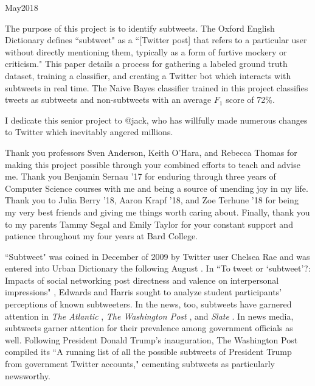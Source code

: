\documentclass[11pt, twoside, reqno]{book}
\begin{document}
    {May}{2018}

\abstr

The purpose of this project is to identify subtweets. The Oxford English Dictionary defines ``subtweet" as a ``[Twitter post] that refers to a particular user without directly mentioning them, typically as a form of furtive mockery or criticism." This paper details a process for gathering a labeled ground truth dataset, training a classifier, and creating a Twitter bot which interacts with subtweets in real time. The Naive Bayes classifier trained in this project classifies tweets as subtweets and non-subtweets with an average $F_{1}$ score of 72\%. 

\tableofcontents

\listoffigures

\dedic

I dedicate this senior project to @jack, who has willfully made numerous changes to Twitter which inevitably angered millions.

\acknowl

Thank you professors Sven Anderson, Keith O'Hara, and Rebecca Thomas for making this project possible through your combined efforts to teach and advise me. Thank you Benjamin Sernau '17 for enduring through three years of Computer Science courses with me and being a source of unending joy in my life. Thank you to Julia Berry '18, Aaron Krapf '18, and Zoe Terhune '18 for being my very best friends and giving me things worth caring about. Finally, thank you to my parents Tammy Segal and Emily Taylor for your constant support and patience throughout my four years at Bard College. 

\startmain
\intro

``Subtweet" was coined in December of 2009 by Twitter user Chelsea Rae \cite{first_subtweet} and was entered into Urban Dictionary the following August \cite{urban_dictionary}. In ``To tweet or ‘subtweet’?: Impacts of social networking post directness and valence on interpersonal impressions" \cite{subtweets_communications}, Edwards and Harris sought to analyze student participants' perceptions of known subtweeters. In the news, too, subtweets have garnered attention in \textit{The Atlantic} \cite{the_atlantic}, \textit{The Washington Post} \cite{the_washington_post}, and \textit{Slate} \cite{slate}. In news media, subtweets garner attention for their prevalence among government officials as well. Following President Donald Trump's inauguration, The Washington Post compiled its ``A running list of all the possible subtweets of President Trump from government Twitter accounts," \cite{the_washington_post_trump} cementing subtweets as particularly newsworthy.
\end{document}

